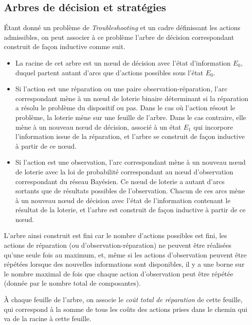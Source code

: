 \documentclass[a4paper,11pt]{article}
\theoremstyle{plain}
\theoremstyle{definition}
\begin{document}
\subsection{Arbres de décision et stratégies}
\label{SecArbresEtStrategies}

Étant donné un problème de \emph{Troubleshooting} et un cadre définissant les actions admissibles, on peut associer à ce problème l'arbre de décision correspondant construit de façon inductive comme suit.

\begin{itemize}
\item La racine de cet arbre est un nœud de décision avec l'état d'information $E_0$, duquel partent autant d'arcs que d'actions possibles sous l'état $E_0$.

\item Si l'action est une réparation ou une paire observation-réparation, l'arc correspondant mène à un nœud de loterie binaire déterminant si la réparation a résolu le problème du dispositif ou pas. Dans le cas où l'action résout le problème, la loterie mène sur une feuille de l'arbre. Dans le cas contraire, elle mène à un nouveau nœud de décision, associé à un état $E_1$ qui incorpore l'information issue de la réparation, et l'arbre se construit de façon inductive à partir de ce nœud.

\item Si l'action est une observation, l'arc correspondant mène à un nouveau nœud de loterie avec la loi de probabilité correspondant au nœud d'observation correspondant du réseau Bayésien. Ce nœud de loterie a autant d'arcs sortants que de résultats possibles de l'observation. Chacun de ces arcs mène à un nouveau nœud de décision avec l'état de l'information contenant le résultat de la loterie, et l'arbre est construit de façon inductive à partir de ce nœud.
\end{itemize}

L'arbre ainsi construit est fini car le nombre d'actions possibles est fini, les actions de réparation (ou d'observation-réparation) ne peuvent être réalisées qu'une seule fois au maximum, et, même si les actions d'observation peuvent être répétées lorsque des nouvelles informations sont disponibles, il y a une borne sur le nombre maximal de fois que chaque action d'observation peut être répétée (donnée par le nombre total de composantes).

À chaque feuille de l'arbre, on associe le \emph{coût total de réparation} de cette feuille, qui correspond à la somme de tous les coûts des actions prises dans le chemin qui va de la racine à cette feuille.
\end{document}
